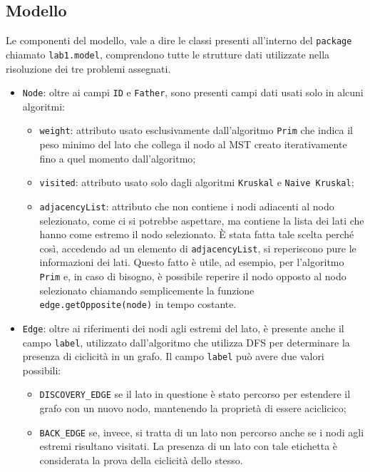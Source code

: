 \subsection{Modello}
Le componenti del modello, vale a dire le classi presenti all'interno del \texttt{package} chiamato \texttt{lab1.model}, comprendono tutte le strutture dati utilizzate nella risoluzione dei tre problemi assegnati. 
\begin{itemize}
\item \texttt{Node}: oltre ai campi \texttt{ID} e \texttt{Father}, sono presenti campi dati usati solo in alcuni algoritmi:
	\begin{itemize}
		\item \texttt{weight}: attributo usato esclusivamente dall'algoritmo \texttt{Prim} che indica il peso minimo del lato che collega il nodo al MST creato iterativamente fino a quel momento dall'algoritmo;
		\item \texttt{visited}: attributo usato solo dagli algoritmi \texttt{Kruskal} e \texttt{Naive Kruskal};
		\item \texttt{adjacencyList}: attributo che non contiene i nodi adiacenti al nodo selezionato, come ci si potrebbe aspettare, ma contiene la lista dei lati che hanno come estremo il nodo selezionato. È stata fatta tale scelta perché così, accedendo ad un elemento di \texttt{adjacencyList}, si reperiscono pure le informazioni dei lati. Questo fatto è utile, ad esempio, per l'algoritmo \texttt{Prim} e, in caso di bisogno, è possibile reperire il nodo opposto al nodo selezionato chiamando semplicemente la funzione \texttt{edge.getOpposite(node)} in tempo costante.
	\end{itemize}
	\item \texttt{Edge}: oltre ai riferimenti dei nodi agli estremi del lato, è presente anche il campo \texttt{label}, utilizzato dall'algoritmo che utilizza DFS per determinare la presenza di ciclicità in un grafo. Il campo \texttt{label} può avere due valori possibili:
	\begin{itemize}
		\item \texttt{DISCOVERY\_EDGE} se il lato in questione è stato percorso per estendere il grafo con un nuovo nodo, mantenendo la proprietà di essere aciclicico;
		\item \texttt{BACK\_EDGE} se, invece, si tratta di un lato non percorso anche se i nodi agli estremi risultano visitati. La presenza di un lato con tale etichetta è considerata la prova della ciclicità dello stesso.
		\end{itemize}

\end{itemize}
